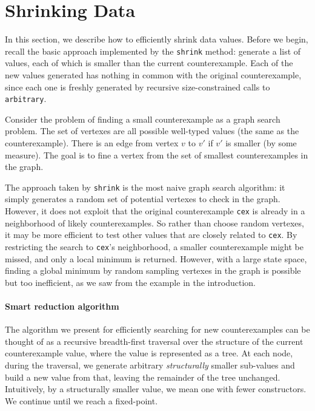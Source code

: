 \documentclass[9pt]{sigplanconf}
\newcommand{\ttp}[1]{\texttt{#1}}
\begin{document}


\section{Shrinking Data}
In this section, we describe how to efficiently shrink data values.  Before we
begin, recall the basic approach implemented by the \ttp{shrink} method:
generate a list of values, each of which is smaller than the current
counterexample.  Each of the new values generated has nothing in common with the
original counterexample, since each one is freshly generated by recursive
size-constrained calls to \ttp{arbitrary}.

Consider the problem of finding a small counterexample as a graph search
problem.  The set of vertexes are all possible well-typed values (the same as
the counterexample).  There is an edge from vertex $v$ to $v'$ if $v'$ is
smaller (by some measure).  The goal is to fine a vertex from the set of
smallest counterexamples in the graph.

The approach taken by \ttp{shrink} is the most naive graph search algorithm:
it simply generates a random set of potential vertexes to check in the graph.
However, it does not exploit that the original counterexample \ttp{cex} is
already in a neighborhood of likely counterexamples.  So rather than choose
random vertexes, it may be more efficient to test other values that are closely
related to \ttp{cex}.  By restricting the search to \ttp{cex}'s neighborhood, a
smaller counterexample might be missed, and only a local minimum is returned.
However, with a large state space, finding a global minimum by random sampling
vertexes in the graph is possible but too inefficient, as we saw from the
example in the introduction.

\paragraph{Smart reduction algorithm}
The algorithm we present for efficiently searching for new counterexamples can
be thought of as a recursive breadth-first traversal over the structure of the
current counterexample value, where the value is represented as a tree.  At each
node, during the traversal, we generate arbitrary \emph{structurally} smaller
sub-values and build a new value from that, leaving the remainder of the tree
unchanged.  Intuitively, by a structurally smaller value, we mean one with fewer
constructors.  We continue until we reach a fixed-point.
\end{document}
